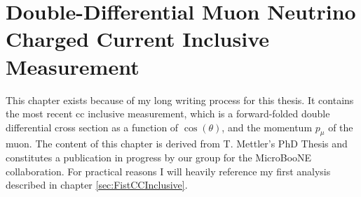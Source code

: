 \chapter{Double-Differential Muon Neutrino Charged Current Inclusive Measurement} \label{sec:NewCCInclusive}
This chapter exists because of my long writing process for this thesis. It contains the most recent \gls{cc} inclusive measurement, which is a forward-folded double differential cross section as a function of $\cos{(\theta)}$, and the momentum $p_\mu$ of the muon. The content of this chapter is derived from T. Mettler's PhD Thesis \cite{CRTThomasPhD} and constitutes a publication in progress by our group for the MicroBooNE collaboration. For practical reasons I will heavily reference my first analysis described in chapter \ref{sec:FistCCInclusive}.

